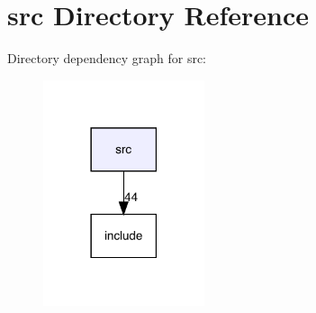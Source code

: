 \section{src Directory Reference}
\label{dir_68267d1309a1af8e8297ef4c3efbcdba}
Directory dependency graph for src\+:
\nopagebreak
\begin{figure}[H]
\begin{center}
\leavevmode
\includegraphics[width=134pt]{dir_68267d1309a1af8e8297ef4c3efbcdba_dep}
\end{center}
\end{figure}
